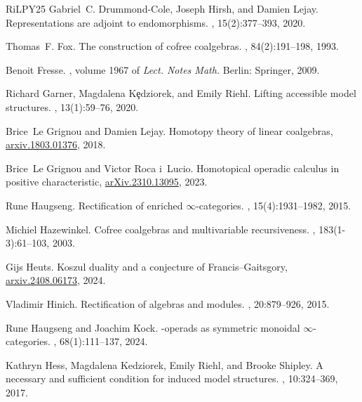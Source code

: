 \documentclass{proc-l}
\theoremstyle{plain}
\theoremstyle{definition}
\theoremstyle{remark}
\begin{document}
\begin{thebibliography}{RiLPY25}
Gabriel~C. Drummond-Cole, Joseph Hirsh, and Damien Lejay.
\newblock Representations are adjoint to endomorphisms.
, 15(2):377--393, 2020.

Thomas~F. Fox.
\newblock The construction of cofree coalgebras.
, 84(2):191--198, 1993.

Benoit Fresse.
, volume 1967 of {\em Lect.
  Notes Math.}
\newblock Berlin: Springer, 2009.

Richard Garner, Magdalena K{\c{e}}dziorek, and Emily Riehl.
\newblock Lifting accessible model structures.
, 13(1):59--76, 2020.

Brice~Le Grignou and Damien Lejay.
\newblock Homotopy theory of linear coalgebras,
  \href{https://arxiv.org/abs/1803.01376}{arxiv.1803.01376}, 2018.

Brice~Le Grignou and Victor {R}oca {i}~{L}ucio.
\newblock Homotopical operadic calculus in positive characteristic,
  \href{https://arxiv.org/abs/2310.13095}{arXiv.2310.13095}, 2023.

Rune Haugseng.
\newblock Rectification of enriched {$\infty$}-categories.
, 15(4):1931--1982, 2015.

Michiel Hazewinkel.
\newblock Cofree coalgebras and multivariable recursiveness.
, 183(1-3):61--103, 2003.

Gijs Heuts.
\newblock Koszul duality and a conjecture of {F}rancis--{G}aitsgory,
  \href{https://arxiv.org/pdf/2408.06173}{arxiv.2408.06173}, 2024.

Vladimir Hinich.
\newblock Rectification of algebras and modules.
, 20:879--926, 2015.

Rune Haugseng and Joachim Kock.
\newblock {{\(\infty\)}}-operads as symmetric monoidal
  {{\(\infty\)}}-categories.
, 68(1):111--137, 2024.

Kathryn Hess, Magdalena Kedziorek, Emily Riehl, and Brooke Shipley.
\newblock A necessary and sufficient condition for induced model structures.
, 10:324--369, 2017.


\end{thebibliography}
\end{document}
